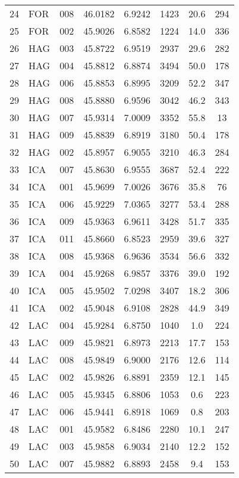 \begin{table}[htbp]
\begin{tabular}{|l|l|c|c|c|c|c|c|}
24 & FOR & 008 & 46.0182 & 6.9242 & 1423 & 20.6 & 294 \\
25 & FOR & 002 & 45.9026 & 6.8582 & 1224 & 14.0 & 336 \\
26 & HAG & 003 & 45.8722 & 6.9519 & 2937 & 29.6 & 282 \\
27 & HAG & 004 & 45.8812 & 6.8874 & 3494 & 50.0 & 178 \\
28 & HAG & 006 & 45.8853 & 6.8995 & 3209 & 52.2 & 347 \\
29 & HAG & 008 & 45.8880 & 6.9596 & 3042 & 46.2 & 343 \\
30 & HAG & 007 & 45.9314 & 7.0009 & 3352 & 55.8 & 13 \\
31 & HAG & 009 & 45.8839 & 6.8919 & 3180 & 50.4 & 178 \\
32 & HAG & 002 & 45.8957 & 6.9055 & 3210 & 46.3 & 284 \\
33 & ICA & 007 & 45.8630 & 6.9555 & 3687 & 52.4 & 222 \\
34 & ICA & 001 & 45.9699 & 7.0026 & 3676 & 35.8 & 76 \\
35 & ICA & 006 & 45.9229 & 7.0365 & 3277 & 53.4 & 288 \\
36 & ICA & 009 & 45.9363 & 6.9611 & 3428 & 51.7 & 335 \\
37 & ICA & 011 & 45.8660 & 6.8523 & 2959 & 39.6 & 327 \\
38 & ICA & 008 & 45.9368 & 6.9636 & 3534 & 56.6 & 332 \\
39 & ICA & 004 & 45.9268 & 6.9857 & 3376 & 39.0 & 192 \\
40 & ICA & 005 & 45.9502 & 7.0298 & 3407 & 18.2 & 306 \\
41 & ICA & 002 & 45.9048 & 6.9108 & 2828 & 44.9 & 349 \\
42 & LAC & 004 & 45.9284 & 6.8750 & 1040 & 1.0 & 224 \\
43 & LAC & 009 & 45.9821 & 6.8973 & 2213 & 17.7 & 153 \\
44 & LAC & 008 & 45.9849 & 6.9000 & 2176 & 12.6 & 114 \\
45 & LAC & 002 & 45.9826 & 6.8891 & 2359 & 12.1 & 145 \\
46 & LAC & 005 & 45.9345 & 6.8806 & 1053 & 0.6 & 223 \\
47 & LAC & 006 & 45.9441 & 6.8918 & 1069 & 0.8 & 203 \\
48 & LAC & 001 & 45.9582 & 6.8486 & 2280 & 10.1 & 247 \\
49 & LAC & 003 & 45.9858 & 6.9034 & 2140 & 12.2 & 152 \\
50 & LAC & 007 & 45.9882 & 6.8893 & 2458 & 9.4 & 153 \\

\end{tabular}
\end{table}
